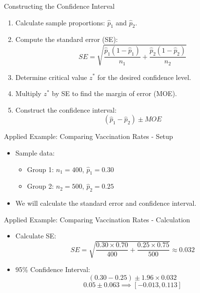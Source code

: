 \documentclass[handout]{beamer} %
\begin{document}
\begin{frame}{Constructing the Confidence Interval}
  \begin{enumerate}
    \item Calculate sample proportions: $\hat{p}_1$ and $\hat{p}_2$.
    \item Compute the standard error (SE):
    \[
    SE = \sqrt{\frac{\hat{p}_1(1-\hat{p}_1)}{n_1} + \frac{\hat{p}_2(1-\hat{p}_2)}{n_2}}
    \]
    \item Determine critical value $z^*$ for the desired confidence level.
    \item Multiply $z^*$ by SE to find the margin of error (MOE).
    \item Construct the confidence interval:
    \[
    (\hat{p}_1 - \hat{p}_2) \pm MOE
    \]
  \end{enumerate}
\end{frame}



\begin{frame}{Applied Example: Comparing Vaccination Rates - Setup}
  \begin{itemize}
    \item Sample data:
    \begin{itemize}
      \item Group 1: $n_1 = 400$, $\hat{p}_1 = 0.30$
      \item Group 2: $n_2 = 500$, $\hat{p}_2 = 0.25$
    \end{itemize}
    \item We will calculate the standard error and confidence interval.
  \end{itemize}
\end{frame}

\begin{frame}{Applied Example: Comparing Vaccination Rates - Calculation}
  \begin{itemize}
    \item Calculate SE:
    \[
    SE = \sqrt{\frac{0.30 \times 0.70}{400} + \frac{0.25 \times 0.75}{500}} \approx 0.032
    \]
    \item 95\% Confidence Interval:
    \[
    (0.30 - 0.25) \pm 1.96 \times 0.032
    \]
    \[
    0.05 \pm 0.063 \implies [-0.013, 0.113]
    \]
  \end{itemize}
\end{frame}
\end{document}

